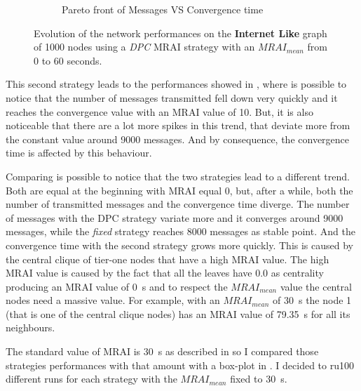 \begin{figure}[h]
\begin{subfigure}[b]{0.45\textwidth}
		 \caption{Pareto front of Messages VS Convergence time}
         \label{fig:internt_like_1000_DPC_evolution_paretoFront}
     \end{subfigure}
		\caption{Evolution of the network performances on the \textbf{Internet Like} graph
			of \num{1000} nodes using a \textit{DPC} \ac{MRAI} strategy
			with an $MRAI_{mean}$ from \num{0} to \num{60} seconds.}
        \label{fig:internet_like_1000_dpc_evolution}
\end{figure}

This second strategy leads to the performances showed in ,
where is possible to notice that the number of messages transmitted fell down
very quickly and it reaches the convergence value with an \ac{MRAI} value of
\num{10}.
But, it is also noticeable that there are a lot more spikes in this trend, that
deviate more from the constant value around \num{9000} messages.
And by consequence, the convergence time is affected by this behaviour.

Comparing 
is possible to notice that the two strategies lead to a different trend.
Both are equal at the beginning with \ac{MRAI} equal \num{0}, but, after a while,
both the number of transmitted messages and the convergence time diverge.
The number of messages with the \ac{DPC} strategy variate more and it converges
around \num{9000} messages, while the \textit{fixed} strategy reaches \num{8000}
messages as stable point.
And the convergence time with the second strategy grows more quickly.
This is caused by the central clique of tier-one nodes that have a high \ac{MRAI}
value.
The high \ac{MRAI} value is caused by the fact that all the leaves have \num{0.0}
as centrality producing an \ac{MRAI} value of \SI{0}{\second} and to respect
the $MRAI_{mean}$ value the central nodes need a massive value.
For example, with an $MRAI_{mean}$ of \SI{30}{\second} the node \num{1} (that is
one of the central clique nodes) has an \ac{MRAI} value of \SI{79.35}{\second} for all its
neighbours.


The standard value of \ac{MRAI} is \SI{30}{\second} as described in
\cite{rfc4271} so I compared those strategies performances with that amount
with a box-plot in .
I decided to ru\num{100} different runs for each strategy with the $MRAI_{mean}$
fixed to \SI{30}{\second}.

